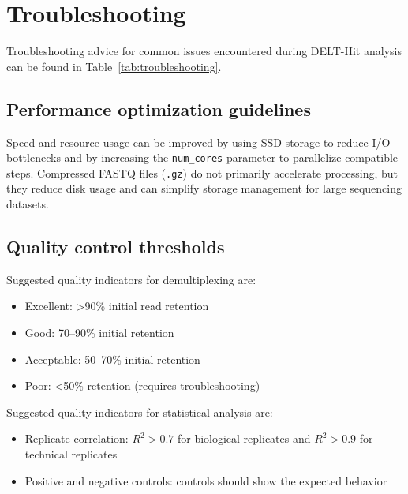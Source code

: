 \section{Troubleshooting}
Troubleshooting advice for common issues encountered during DELT-Hit analysis can be found in Table~\ref{tab:troubleshooting}.




\subsection{Performance optimization guidelines}
Speed and resource usage can be improved by using SSD storage to reduce I/O bottlenecks and by increasing the \texttt{num\_cores} parameter to parallelize compatible steps. Compressed FASTQ files (\texttt{.gz}) do not primarily accelerate processing, but they reduce disk usage and can simplify storage management for large sequencing datasets.

\subsection{Quality control thresholds}
Suggested quality indicators for demultiplexing are:

\begin{itemize}
  \item Excellent: \textgreater{}90\% initial read retention
  \item Good: 70--90\% initial retention
  \item Acceptable: 50--70\% initial retention
  \item Poor: \textless{}50\% retention (requires troubleshooting)
\end{itemize}
Suggested quality indicators for statistical analysis are:

\begin{itemize}
  \item Replicate correlation: $R^2 > 0.7$ for biological replicates and $R^2 > 0.9$ for technical replicates
  \item Positive and negative controls: controls should show the expected behavior
\end{itemize}
